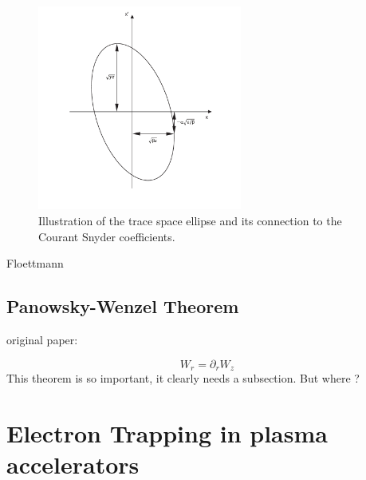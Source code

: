 \begin{figure}

\begin{center}
\includegraphics[width=0.6\textwidth]{theory/images/edited/TraceSpaceCourantSnyder.pdf}
\end{center}
\caption{Illustration of the trace space ellipse and its connection to the Courant Snyder coefficients.}
\label{img:TraceSpace}
\end{figure}
Floettmann 
\subsection{Panowsky-Wenzel Theorem}

original paper:  \cite{Panowsky_Wenzel_original}

 \begin{equation}
W_r =\partial_r W_z
\end{equation} 
This theorem is so important, it clearly needs a subsection. But where ?


\section{Electron Trapping in plasma accelerators}
\label{sec:Theory_Trapping}

